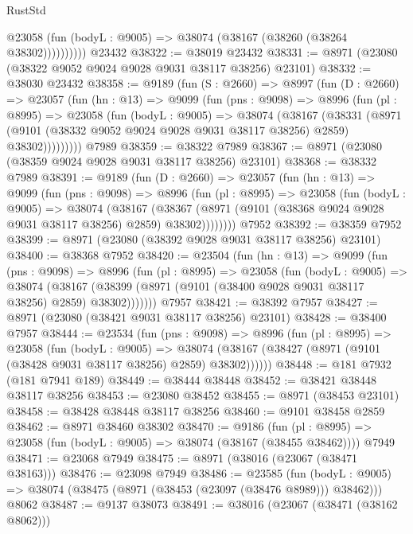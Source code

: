 \begin{lexlean}{RustStd}
\begin{coremodule}
              @23058 (fun (bodyL : @9005) => @38074 (@38167 (@38260 (@38264 @38302))))))))))
    @23432
@38322 := @38019 @23432
@38331 := @8971 (@23080 (@38322 @9052 @9024 @9028 @9031 @38117 @38256) @23101)
@38332 := @38030 @23432
@38358 := @9189
    (fun (S : @2660) =>
    @8997
      (fun (D : @2660) =>
      @23057
        (fun (hn : @13) =>
        @9099
          (fun (pns : @9098) =>
          @8996
            (fun (pl : @8995) =>
            @23058
              (fun (bodyL : @9005) =>
              @38074
                (@38167
                  (@38331
                    (@8971
                      (@9101 (@38332 @9052 @9024 @9028 @9031 @38117 @38256) @2859)
                      @38302)))))))))
    @7989
@38359 := @38322 @7989
@38367 := @8971 (@23080 (@38359 @9024 @9028 @9031 @38117 @38256) @23101)
@38368 := @38332 @7989
@38391 := @9189
    (fun (D : @2660) =>
    @23057
      (fun (hn : @13) =>
      @9099
        (fun (pns : @9098) =>
        @8996
          (fun (pl : @8995) =>
          @23058
            (fun (bodyL : @9005) =>
            @38074
              (@38167
                (@38367 (@8971 (@9101 (@38368 @9024 @9028 @9031 @38117 @38256) @2859) @38302))))))))
    @7952
@38392 := @38359 @7952
@38399 := @8971 (@23080 (@38392 @9028 @9031 @38117 @38256) @23101)
@38400 := @38368 @7952
@38420 := @23504
    (fun (hn : @13) =>
    @9099
      (fun (pns : @9098) =>
      @8996
        (fun (pl : @8995) =>
        @23058
          (fun (bodyL : @9005) =>
          @38074
            (@38167 (@38399 (@8971 (@9101 (@38400 @9028 @9031 @38117 @38256) @2859) @38302)))))))
    @7957
@38421 := @38392 @7957
@38427 := @8971 (@23080 (@38421 @9031 @38117 @38256) @23101)
@38428 := @38400 @7957
@38444 := @23534
    (fun (pns : @9098) =>
    @8996
      (fun (pl : @8995) =>
      @23058
        (fun (bodyL : @9005) =>
        @38074 (@38167 (@38427 (@8971 (@9101 (@38428 @9031 @38117 @38256) @2859) @38302))))))
@38448 := @181 @7932 (@181 @7941 @189)
@38449 := @38444 @38448
@38452 := @38421 @38448 @38117 @38256
@38453 := @23080 @38452
@38455 := @8971 (@38453 @23101)
@38458 := @38428 @38448 @38117 @38256
@38460 := @9101 @38458 @2859
@38462 := @8971 @38460 @38302
@38470 := @9186
    (fun (pl : @8995) => @23058 (fun (bodyL : @9005) => @38074 (@38167 (@38455 @38462))))
    @7949
@38471 := @23068 @7949
@38475 := @8971 (@38016 (@23067 (@38471 @38163)))
@38476 := @23098 @7949
@38486 := @23585
    (fun (bodyL : @9005) => @38074 (@38475 (@8971 (@38453 (@23097 (@38476 @8989))) @38462)))
    @8062
@38487 := @9137 @38073
@38491 := @38016 (@23067 (@38471 (@38162 @8062)))

\end{coremodule}
\end{lexlean}
